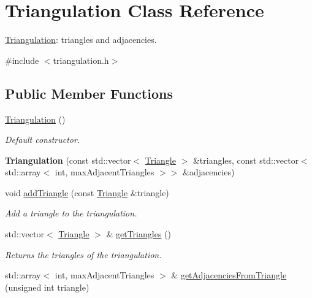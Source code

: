 \hypertarget{classTriangulation}{}\section{Triangulation Class Reference}
\label{classTriangulation}


\hyperlink{classTriangulation}{Triangulation}\+: triangles and adjacencies.  




{\ttfamily \#include $<$triangulation.\+h$>$}

\subsection*{Public Member Functions}
\begin{DoxyCompactItemize}
\item 
\mbox{\label{classTriangulation_a56118103ad86aa7b37d7a005892bfeca}} 
\hyperlink{classTriangulation_a56118103ad86aa7b37d7a005892bfeca}{Triangulation} ()
\begin{DoxyCompactList}\small\item\em Default constructor. \end{DoxyCompactList}\item 
\mbox{\label{classTriangulation_ae1d2320b4ca69156f29a4e27dff921f1}} 
{\bfseries Triangulation} (const std\+::vector$<$ \hyperlink{classTriangle}{Triangle} $>$ \&triangles, const std\+::vector$<$ std\+::array$<$ int, max\+Adjacent\+Triangles $>$$>$ \&adjacencies)
\item 
void \hyperlink{classTriangulation_a2143e3330a01aeb0c49343e20a513e41}{add\+Triangle} (const \hyperlink{classTriangle}{Triangle} \&triangle)
\begin{DoxyCompactList}\small\item\em Add a triangle to the triangulation. \end{DoxyCompactList}\item 
std\+::vector$<$ \hyperlink{classTriangle}{Triangle} $>$ \& \hyperlink{classTriangulation_a9245c1ffae5777f76f51b217f267d594}{get\+Triangles} ()
\begin{DoxyCompactList}\small\item\em Returns the triangles of the triangulation. \end{DoxyCompactList}\item 
std\+::array$<$ int, max\+Adjacent\+Triangles $>$ \& \hyperlink{classTriangulation_aed2622d943855cc76be697e6a091be0d}{get\+Adjacencies\+From\+Triangle} (unsigned int triangle)
$$
\end{DoxyCompactItemize}
